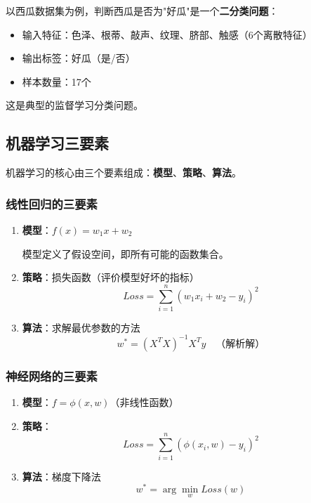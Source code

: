 \documentclass[12pt,a4paper]{ctexart}
\begin{document}
\begin{examplebox}[西瓜数据集示例]
以西瓜数据集为例，判断西瓜是否为"好瓜"是一个\textbf{二分类问题}：
\begin{itemize}
    \item 输入特征：色泽、根蒂、敲声、纹理、脐部、触感（6个离散特征）
    \item 输出标签：好瓜（是/否）
    \item 样本数量：17个
\end{itemize}
这是典型的监督学习分类问题。
\end{examplebox}

\subsection{机器学习三要素}

机器学习的核心由三个要素组成：\textbf{模型}、\textbf{策略}、\textbf{算法}。

\subsubsection{线性回归的三要素}

\begin{enumerate}
    \item \textbf{模型}：$f(x) = w_1 x + w_2$
    
    模型定义了假设空间，即所有可能的函数集合。
    
    \item \textbf{策略}：损失函数（评价模型好坏的指标）
    \[
    Loss = \sum_{i=1}^{n}(w_1 x_i + w_2 - y_i)^2
    \]
    
    \item \textbf{算法}：求解最优参数的方法
    \[
    w^* = (X^T X)^{-1} X^T y \quad \text{（解析解）}
    \]
\end{enumerate}

\subsubsection{神经网络的三要素}

\begin{enumerate}
    \item \textbf{模型}：$f = \phi(x, w)$（非线性函数）
    
    \item \textbf{策略}：
    \[
    Loss = \sum_{i=1}^{n}(\phi(x_i, w) - y_i)^2
    \]
    
    \item \textbf{算法}：梯度下降法
    \[
    w^* = \arg\min_w Loss(w)
    \]
\end{enumerate}
\end{document}
